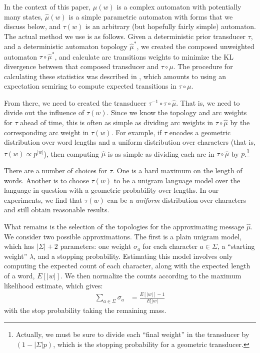 \documentclass[11pt,a4paper]{article}
\begin{document}
In the context of this paper, $\mu(w)$ is a complex automaton with
potentially many states, $\hat\mu(w)$ is a simple parametric automaton
with forms that we discuss below, and $\tau(w)$ is an arbitrary
(but hopefully fairly simple) automaton. The actual method we use
is as follows. Given a deterministic prior transducer $\tau$, and
a deterministic automaton topology $\hat\mu^*$, we created the
composed unweighted automaton $\tau \circ \hat \mu^*$, and calculate
arc transitions weights to minimize the KL divergence between that
composed transducer and $\tau\circ\mu$. The procedure for calculating
these statistics was described in , which
amounts to using an expectation semiring \cite{eisner2001expectation}
to compute expected transitions in $\tau\circ\mu$.

From there, we need to created the transducer
$\tau^{-1}\circ\tau\circ\hat\mu$. That is, we need to divide out
the influence of $\tau(w)$. Since we know the topology and arc
weights for $\tau$ ahead of time, this is often as simple as dividing
arc weights in $\tau\circ\hat\mu$ by the corresponding arc weight
in $\tau(w)$. For example, if $\tau$ encodes a geometric distribution
over word lengths and a uniform distribution over characters (that
is, $\tau(w) \propto {p^{|w|}}$), then computing $\hat\mu$ is as
simple as dividing each arc in $\tau\circ\hat\mu$ by
$p$.\footnote{Actually, we must be sure to divide each ``final
weight'' in the transducer by $(1-|\Sigma| p)$, which is the stopping
probability for a geometric transducer.}

There are a number of choices for $\tau$. One is a hard maximum on the
length of words. Another is to choose $\tau(w)$ to be a unigram
language model over the language in question with a geometric
probability over lengths. In our experiments, we find that $\tau(w)$
can be a \textit{uniform} distribution over characters and still
obtain reasonable results.

What remains is the selection of the topologies for the approximating
message $\hat\mu$. We consider two possible approximations. The
first is a plain unigram model, which has $|\Sigma|+2$ parameters:
one weight $\sigma_a$ for each character $a \in \Sigma$, a ``starting weight'' $\lambda$, and
a stopping probability. Estimating this model involves only computing
the expected count of each character, along with the expected
length of a word, $E[|w|]$. We then normalize the counts according
to the maximum likelihood estimate, which gives:
\begin{equation}
  \begin{split}
    \sum_{a\in\Sigma} \sigma_a &= \frac{E[|w|]-1}{E[|w|}
   \end{split}
 \end{equation}
with the stop probability taking the remaining mass. 
\end{document}
